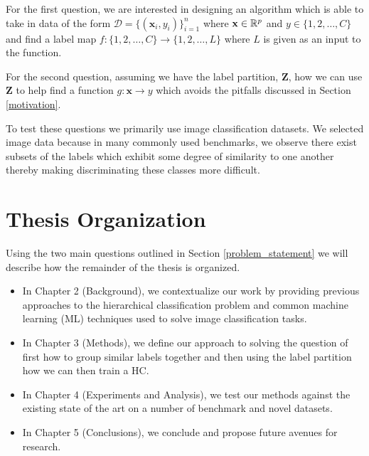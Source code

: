 \documentclass[draft, ../thesis.tex]{subfiles}
\begin{document}
    For the first question, we are interested in designing an algorithm which is able to take in data of the form $\mathcal{D} = \{(\mathbf{x}_i, y_i)\}_{i=1}^n$ where $\mathbf{x} \in \mathbb{R}^p$ and $y \in \{1, 2, \ldots, C\}$ and find a label map $f: \{1, 2, \ldots, C\} \longrightarrow \{1, 2, \ldots, L\}$ where $L$ is given as an input to the function. 
    
    For the second question, assuming we have the label partition, $\mathbf{Z}$, how we can use $\mathbf{Z}$ to help find a function $g: \mathbf{x} \longrightarrow y$ which avoids the pitfalls discussed in Section \ref{motivation}.
    
    To test these questions we primarily use image classification datasets. We selected image data because in many commonly used benchmarks, we observe there exist subsets of the labels which exhibit some degree of similarity to one another thereby making discriminating these classes more difficult.
    
    \section{Thesis Organization}
    Using the two main questions outlined in Section \ref{problem_statement} we will describe how the remainder of the thesis is organized.
    
    \begin{itemize}
    	\item In Chapter 2 (Background), we contextualize our work by providing previous approaches to the hierarchical classification problem and common machine learning (ML) techniques used to solve image classification tasks. 
    	
    	\item In Chapter 3 (Methods), we define our approach to solving the question of first how to group similar labels together and then using the label partition how we can then train a HC.  
    	
    	\item In Chapter 4 (Experiments and Analysis), we test our methods against the existing state of the art on a number of benchmark and novel datasets. 
    	
    	\item In Chapter 5 (Conclusions), we conclude and propose future avenues for research.
    \end{itemize}
\end{document}
